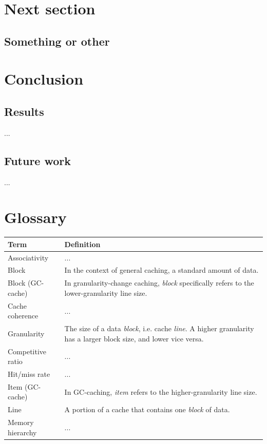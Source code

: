 \documentclass[12pt,twoside]{reedthesis}
\begin{document}

\chapter{Next section}

\section{Something or other}

\chapter{Conclusion}

\section{Results}

...

\section{Future work}

...

\appendix
\chapter{Glossary}

\def\arraystretch{1.5}
\begin{tabular}{p{1.5in}p{3.8in}}
    \hline
    \textbf{Term}       & \textbf{Definition} \\
    \hline
	Associativity		& ... \\
	Block               & In the context of general caching, a standard amount of data. \\
	Block (GC-cache)	& In granularity-change caching, \textit{block} specifically refers to the lower-granularity line size. \\
	Cache coherence		& ... \\
	Granularity         & The size of a data \textit{block}, i.e. cache \textit{line}. A higher granularity has a larger block size, and lower vice versa. \\
	Competitive ratio	& ... \\
	Hit/miss rate 		& ... \\
    Item (GC-cache)  	& In GC-caching, \textit{item} refers to the higher-granularity line size. \\
    Line                & A portion of a cache that contains one \textit{block} of data. \\
	Memory hierarchy	& ... \\
\end{tabular}
\end{document}
